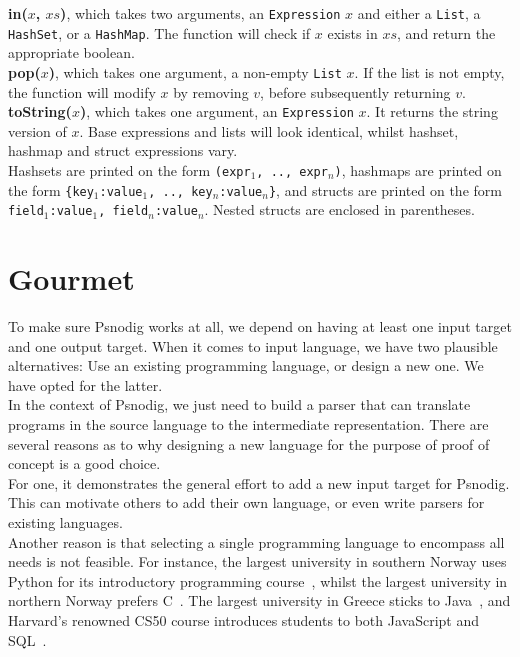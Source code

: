 \textbf{in($x$, $xs$)}, which takes two arguments, an \texttt{Expression} $x$ and either a \texttt{List}, a \texttt{HashSet}, or a \texttt{HashMap}. The function will check if $x$ exists in $xs$, and return the appropriate boolean. \\

\textbf{pop($x$)}, which takes one argument, a non-empty \texttt{List} $x$. If the list is not empty, the function will modify $x$ by removing $v$, before subsequently returning $v$. \\

\textbf{toString($x$)}, which takes one argument, an \texttt{Expression} $x$. It returns the string version of $x$. Base expressions and lists will look identical, whilst hashset, hashmap and struct expressions vary. \\

Hashsets are printed on the form \texttt{(expr$_1$, .., expr$_n$)}, hashmaps are printed on the form \texttt{\{key$_1$:value$_1$, .., key$_n$:value$_n$\}}, and structs are printed on the form \texttt{field$_1$:value$_1$, field$_n$:value$_n$}. Nested structs are enclosed in parentheses.

\section{Gourmet}

To make sure Psnodig works at all, we depend on having at least one input target and one output target. When it comes to input language, we have two plausible alternatives: Use an existing programming language, or design a new one. We have opted for the latter. \\

In the context of Psnodig, we just need to build a parser that can translate programs in the source language to the intermediate representation. There are several reasons as to why designing a new language for the purpose of proof of concept is a good choice. \\

For one, it demonstrates the general effort to add a new input target for Psnodig. This can motivate others to add their own language, or even write parsers for existing languages. \\

Another reason is that selecting a single programming language to encompass all needs is not feasible. For instance, the largest university in southern Norway uses Python for its introductory programming course~\cite{pythonHosUIO}, whilst the largest university in northern Norway prefers C~\cite{cHosUIT}. The largest university in Greece sticks to Java~\cite{javaIHellas}, and Harvard's renowned CS50 course introduces students to both JavaScript and SQL~\cite{javaScriptOgSQLhosHarvard}. \\

